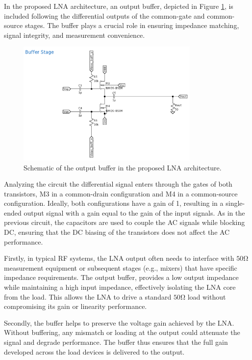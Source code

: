In the proposed LNA architecture, an output buffer, depicted in Figure \ref{fig:schem-buffer}, is included following the differential outputs of the common-gate and common-source stages. The buffer plays a crucial role in ensuring impedance matching, signal integrity, and measurement convenience.

\begin{figure}[H]
    \centering
    \includegraphics[width=0.8\textwidth]{Images/schem-Buffer.png}
    \caption{Schematic of the output buffer in the proposed LNA architecture.}
    \label{fig:schem-buffer}
\end{figure}

Analyzing the circuit the differential signal enters through the gates of both transistors, M3 in a common-drain configuration and M4 in a common-source configuration. Ideally, both configurations have a gain of 1, resulting in a single-ended output signal with a gain equal to the gain of the input signals. As in the previous circuit, the capacitors are used to couple the AC signals while blocking DC, ensuring that the DC biasing of the transistors does not affect the AC performance.

Firstly, in typical RF systems, the LNA output often needs to interface with $50 \si{\ohm}$ measurement equipment or subsequent stages (e.g., mixers) that have specific impedance requirements. The output buffer, provides a low output impedance while maintaining a high input impedance, effectively isolating the LNA core from the load. This allows the LNA to drive a standard $50 \si{\ohm}$ load without compromising its gain or linearity performance.

Secondly, the buffer helps to preserve the voltage gain achieved by the LNA. Without buffering, any mismatch or loading at the output could attenuate the signal and degrade performance. The buffer thus ensures that the full gain developed across the load devices is delivered to the output.

